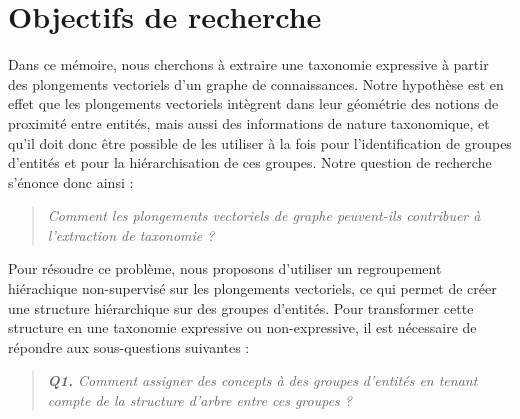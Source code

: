 




\section{Objectifs de recherche}  %

Dans ce mémoire, nous cherchons à extraire une taxonomie expressive à partir des plongements vectoriels d'un graphe de connaissances.
%
Notre hypothèse est en effet que les plongements vectoriels intègrent dans leur géométrie des notions de proximité entre entités, mais aussi des informations de nature taxonomique, et
%
qu'il doit donc être possible de les utiliser à la fois pour l'identification de groupes d'entités et pour la hiérarchisation de ces groupes. 
%
Notre question de recherche s'énonce donc ainsi :

\begin{quote}
    \emph{Comment les plongements vectoriels de graphe peuvent-ils contribuer à l'extraction de taxonomie ?}
\end{quote}


Pour résoudre ce problème, nous proposons d'utiliser un regroupement hiérachique non-supervisé sur les plongements vectoriels, ce qui permet de créer une structure hiérarchique sur des groupes d'entités. Pour transformer cette structure en une taxonomie expressive ou non-expressive, il est nécessaire de répondre aux sous-questions suivantes :
%
\begin{quote}
    \emph{\textbf{Q1.} Comment assigner des concepts à des groupes d'entités en tenant compte de la structure d'arbre entre ces groupes ?}
\end{quote}

